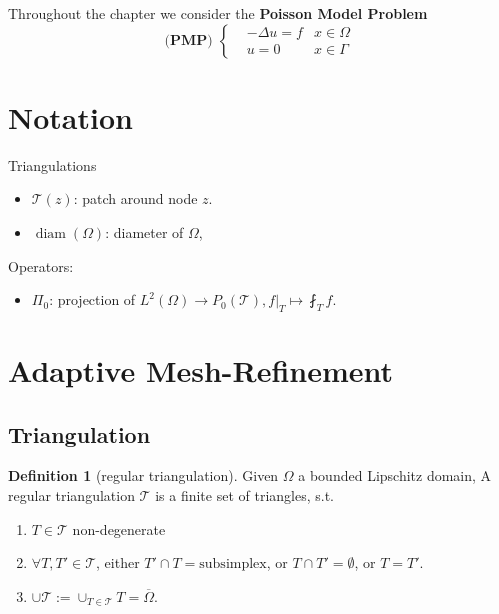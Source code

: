 \documentclass[a4paper,12pt,oneside,fleqn]{book}
\theoremstyle{definition}
\newtheorem{definition}{Definition}[section]
\theoremstyle{remark}
\DeclareMathOperator*{\diam}{diam}
\begin{document}
Throughout the chapter we consider the \textbf{Poisson Model Problem}\label{PMP}
	\begin{equation}
		\textbf{(PMP) }\left\{
		\begin{aligned}
			& - \Delta u = f  &x \in \Omega \\
			& u = 0  & x \in \Gamma
		\end{aligned}
		\right.
	\end{equation}
\section*{Notation}
Triangulations
\begin{itemize}
	\item $\mathcal{T}(z)$: patch around node $z$. 
	\item $\diam(\Omega)$: diameter of $\Omega$,
\end{itemize}
Operators:
\begin{itemize}
	\item $\Pi_0$: projection of $L^2(\Omega) \rightarrow P_0(\mathcal{T}), f|_T \mapsto \fint_T f.  $
\end{itemize}

\section{Adaptive Mesh-Refinement}
\subsection{Triangulation}
\begin{definition}[regular triangulation]
Given $\Omega$ a bounded Lipschitz domain, A regular triangulation $\mathcal{T}$ is a finite set of triangles, s.t.
\begin{enumerate}
	\item $T \in \mathcal{T}$ non-degenerate
	\item $\forall T, T' \in \mathcal{T}$, either $T' \cap T = \text{subsimplex}$, or $T \cap T' = \emptyset$, or $T = T'$. 
	\item $\cup \mathcal{T}:= \cup_{T \in \mathcal{T}} T  = \overline{\Omega}$. 
\end{enumerate}
\end{definition}
\end{document}
